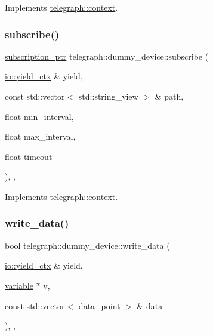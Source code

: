 Implements \hyperlink{classtelegraph_1_1context_aec3b3b0d7210a86f2ea2f5067ef8e922}{telegraph\+::context}.

\mbox{\label{classtelegraph_1_1dummy__device_a8996ac06dfc98de11c3d156b4a0a2caf}} 
\subsubsection{\texorpdfstring{subscribe()}{subscribe()}\hspace{0.1cm}{\footnotesize\ttfamily [2/2]}}
{\footnotesize\ttfamily \hyperlink{namespacetelegraph_a58641aa5b1a2cbdb0431916a87069f64}{subscription\+\_\+ptr} telegraph\+::dummy\+\_\+device\+::subscribe (\begin{DoxyParamCaption}\item[{\hyperlink{structboost_1_1asio_1_1yield__ctx}{io\+::yield\+\_\+ctx} \&}]{yield,  }\item[{const std\+::vector$<$ std\+::string\+\_\+view $>$ \&}]{path,  }\item[{float}]{min\+\_\+interval,  }\item[{float}]{max\+\_\+interval,  }\item[{float}]{timeout }\end{DoxyParamCaption})\hspace{0.3cm}{\ttfamily [inline]}, {\ttfamily [override]}, {\ttfamily [virtual]}}



Implements \hyperlink{classtelegraph_1_1context_a8db167973f187f707a4108e112683969}{telegraph\+::context}.

\mbox{\label{classtelegraph_1_1dummy__device_a162f8f7a02c2907693ecf86662f6ffe1}} 
\subsubsection{\texorpdfstring{write\+\_\+data()}{write\_data()}\hspace{0.1cm}{\footnotesize\ttfamily [1/2]}}
{\footnotesize\ttfamily bool telegraph\+::dummy\+\_\+device\+::write\+\_\+data (\begin{DoxyParamCaption}\item[{\hyperlink{structboost_1_1asio_1_1yield__ctx}{io\+::yield\+\_\+ctx} \&}]{yield,  }\item[{\hyperlink{classtelegraph_1_1variable}{variable} $\ast$}]{v,  }\item[{const std\+::vector$<$ \hyperlink{classtelegraph_1_1data__point}{data\+\_\+point} $>$ \&}]{data }\end{DoxyParamCaption})\hspace{0.3cm}{\ttfamily [inline]}, {\ttfamily [override]}, {\ttfamily [virtual]}}



